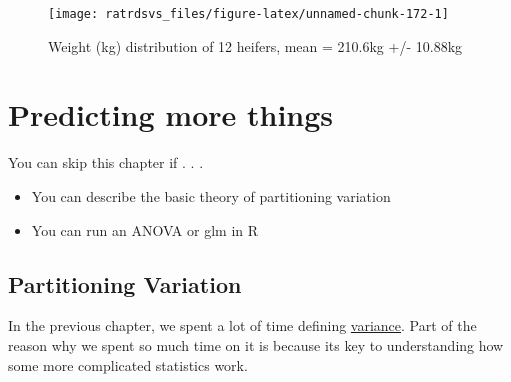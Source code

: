 \documentclass[
]{book}
\newenvironment{Shaded}{\begin{snugshade}}{\end{snugshade}}
\newcommand{\DataTypeTok}[1]{\textcolor[rgb]{0.13,0.29,0.53}{#1}}
\newcommand{\KeywordTok}[1]{\textcolor[rgb]{0.13,0.29,0.53}{\textbf{#1}}}
\newcommand{\NormalTok}[1]{#1}
\newcommand{\OperatorTok}[1]{\textcolor[rgb]{0.81,0.36,0.00}{\textbf{#1}}}
\newcommand{\StringTok}[1]{\textcolor[rgb]{0.31,0.60,0.02}{#1}}
\begin{document}
\begin{Shaded}
\end{Shaded}

\begin{figure}

{\centering \texttt{[image: ratrdsvs\_files/figure-latex/unnamed-chunk-172-1]} 

}

\caption{Weight (kg) distribution of 12 heifers, mean = 210.6kg +/- 10.88kg}\label{fig:unnamed-chunk-172}
\end{figure}

\hypertarget{statsfreq}{%
\chapter{Predicting more things}\label{statsfreq}}

\begin{los}
You can skip this chapter if . . .

\begin{itemize}
\item
  You can describe the basic theory of partitioning variation
\item
  You can run an ANOVA or glm in R
\end{itemize}
\end{los}

\hypertarget{ex_anovatheory}{%
\section{Partitioning Variation}\label{ex_anovatheory}}

In the previous chapter, we spent a lot of time defining \protect\hyperlink{stats_variance}{variance}. Part of the reason why we spent so much time on it is because its key to understanding how some more complicated statistics work.
\end{document}
